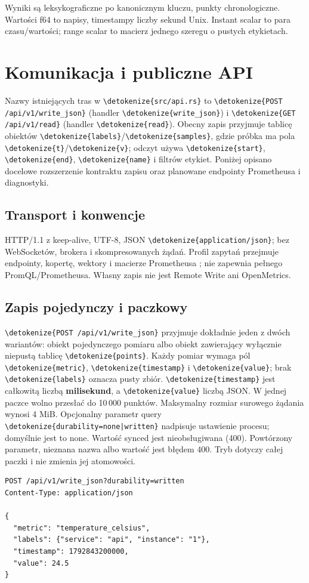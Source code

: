 \documentclass[11pt,a4paper]{article}
\newcommand{\code}[1]{\expandafter\nolinkurl\expandafter{\detokenize{#1}}}
\begin{document}
Wyniki są leksykograficzne po kanonicznym kluczu, punkty chronologiczne.
Wartości f64 to napisy, timestampy liczby sekund Unix.
Instant scalar to para czasu/wartości; range scalar to macierz jednego
szeregu o pustych etykietach.

\section{Komunikacja i publiczne API}
\label{sec:http}

Nazwy istniejących tras w \code{src/api.rs} to
\code{POST /api/v1/write_json} (handler \code{write_json})
i \code{GET /api/v1/read} (handler \code{read}). Obecny zapis przyjmuje
tablicę obiektów \code{labels}/\code{samples}, gdzie próbka ma pola
\code{t}/\code{v}; odczyt używa \code{start}, \code{end}, \code{name}
i filtrów etykiet. Poniżej opisano docelowe rozszerzenie kontraktu zapisu
oraz planowane endpointy Prometheusa i diagnostyki.


\subsection{Transport i konwencje}
HTTP/1.1 z keep-alive, UTF-8, JSON \code{application/json};
bez WebSocketów, brokera i skompresowanych żądań.
Profil zapytań przejmuje endpointy, kopertę, wektory i macierze
Prometheusa \cite{prom-api}; nie zapewnia pełnego PromQL/Prometheusa.
Własny zapis nie jest Remote Write ani OpenMetrics.

\subsection{Zapis pojedynczy i paczkowy}
\code{POST /api/v1/write_json} przyjmuje dokładnie jeden z dwóch wariantów:
obiekt pojedynczego pomiaru albo obiekt zawierający wyłącznie niepustą
tablicę \code{points}. Każdy pomiar wymaga pól \code{metric},
\code{timestamp} i \code{value}; brak \code{labels} oznacza pusty zbiór.
\code{timestamp} jest całkowitą liczbą \textbf{milisekund}, a \code{value}
liczbą JSON. W jednej paczce wolno przesłać do 10\,000 punktów.
Maksymalny rozmiar surowego żądania wynosi 4 MiB.
Opcjonalny parametr query \code{durability=none|written}
nadpisuje ustawienie procesu; domyślnie jest to none.
Wartość synced jest nieobsługiwana (400).
Powtórzony parametr, nieznana nazwa albo wartość jest błędem 400.
Tryb dotyczy całej paczki i nie zmienia jej atomowości.

\begin{lstlisting}
POST /api/v1/write_json?durability=written
Content-Type: application/json

{
  "metric": "temperature_celsius",
  "labels": {"service": "api", "instance": "1"},
  "timestamp": 1792843200000,
  "value": 24.5
}
\end{lstlisting}
\end{document}
